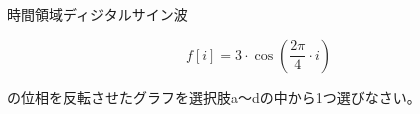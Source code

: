 時間領域ディジタルサイン波 

\[
f[i] = 3 \cdot \cos \left ( \frac{2 \pi}{4}  \cdot i \right )
\]

\noindent の位相を反転させたグラフを選択肢a〜dの中から1つ選びなさい。
